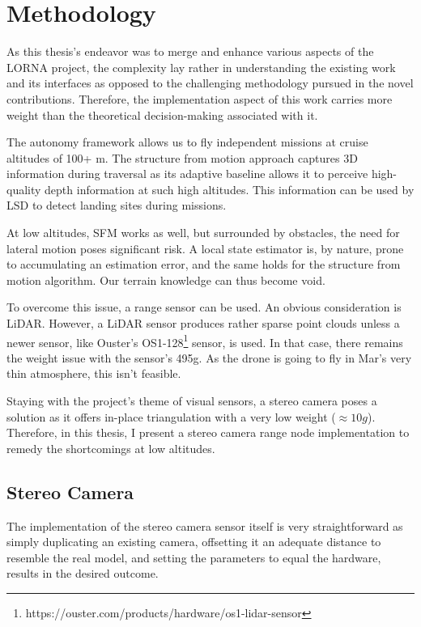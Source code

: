 \chapter{Methodology}
\label{sec:methodology}

As this thesis's endeavor was to merge and enhance various aspects of the LORNA project, the complexity lay rather in understanding the existing work and its interfaces as opposed to the challenging methodology pursued in the novel contributions. Therefore, the implementation aspect of this work carries more weight than the theoretical decision-making associated with it.

The autonomy framework\citep{Autonomy} allows us to fly independent missions at cruise altitudes of 100+ m. The structure from motion approach captures 3D information during traversal as its adaptive baseline allows it to perceive high-quality depth information at such high altitudes. This information can be used by LSD to detect landing sites during missions. 

At low altitudes, SFM works as well, but surrounded by obstacles, the need for lateral motion poses significant risk. A local state estimator is, by nature, prone to accumulating an estimation error, and the same holds for the structure from motion algorithm. Our terrain knowledge can thus become void. 

To overcome this issue, a range sensor can be used. An obvious consideration is LiDAR. However, a LiDAR sensor produces rather sparse point clouds unless a newer sensor, like Ouster's OS1-128\footnote[1]{https://ouster.com/products/hardware/os1-lidar-sensor} sensor, is used. In that case, there remains the weight issue with the sensor's 495g. As the drone is going to fly in Mar's very thin atmosphere, this isn't feasible. 

Staying with the project's theme of visual sensors, a stereo camera poses a solution as it offers in-place triangulation with a very low weight ($\approx 10g$). Therefore, in this thesis, I present a stereo camera range node implementation to remedy the shortcomings at low altitudes.


\section{Stereo Camera}\label{sec:stereo_methodology}

The implementation of the stereo camera sensor itself is very straightforward as simply duplicating an existing camera, offsetting it an adequate distance to resemble the real model, and setting the parameters to equal the hardware, results in the desired outcome.

